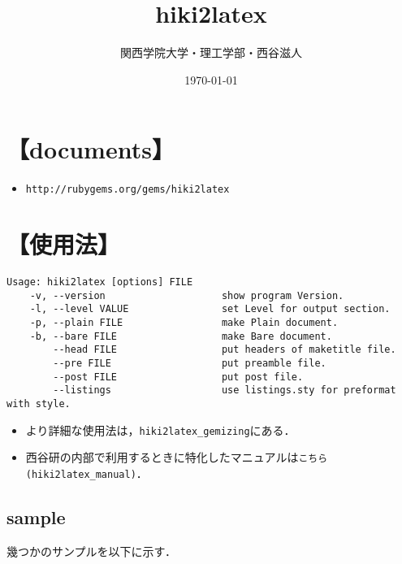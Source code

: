 \documentclass[12pt,a4paper]{jsarticle}
\begin{document}
\title{hiki2latex}
\author{関西学院大学・理工学部・西谷滋人}
\date{\today}
\maketitle

\tableofcontents
\section{【documents】}\begin{itemize}
\item \verb|http://rubygems.org/gems/hiki2latex|
\end{itemize}
\section{【使用法】}\begin{lstlisting}[style=customCsh]
Usage: hiki2latex [options] FILE
    -v, --version                    show program Version.
    -l, --level VALUE                set Level for output section.
    -p, --plain FILE                 make Plain document.
    -b, --bare FILE                  make Bare document.
        --head FILE                  put headers of maketitle file.
        --pre FILE                   put preamble file.
        --post FILE                  put post file.
        --listings                   use listings.sty for preformat with style.
\end{lstlisting}\begin{itemize}
\item より詳細な使用法は，\verb|hiki2latex_gemizing|にある．
\item 西谷研の内部で利用するときに特化したマニュアルは\verb|こちら(hiki2latex_manual)|．
\end{itemize}
\subsection{sample}
幾つかのサンプルを以下に示す．
\end{document}
